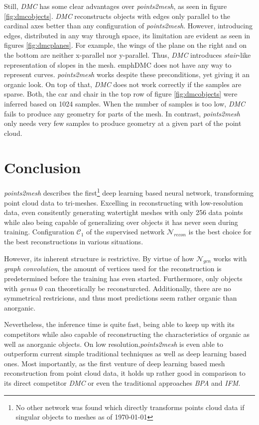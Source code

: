   Still, \emph{DMC} has some clear advantages over \emph{points2mesh}, as seen in figure \ref{fig:dmcobjects}. \emph{DMC} reconstructs objects with edges only 
  parallel to the cardinal axes better than any configuration of \emph{points2mesh}. However, introducing edges, distributed in any way through space,
  its limitation are evident as seen in figures \ref{fig:dmcplanes}. For example, the wings of the plane on the right and on the bottom are neither x-parallel nor y-parallel.
  Thus, \emph{DMC} introduces \emph{stair}-like representation of slopes in the mesh. emph{DMC} does not have any way to represent curves. \emph{points2mesh}
  works despite these preconditions, yet giving it an organic look.
  On top of that, \emph{DMC} does not work correctly if the samples are sparse. Both, the car and chair in the top row of figure \ref{fig:dmcobjects} were inferred based on 1024 samples.
  When the number of samples is too low, \emph{DMC} fails to produce any geometry for parts of the mesh.
  In contrast, \emph{points2mesh} only needs very few samples to produce geometry at a given part of the point cloud.

\section{Conclusion}
\label{conclusion}
  \emph{points2mesh} describes the first\footnote{No other network was found which directly transforms points cloud data if singular objects to meshes as of \today} deep
  learning based neural network, transforming point cloud data to tri-meshes. Excelling in reconstructing with low-resolution data,
  even consitently generating watertight meshes with only 256 data points while also being capable of generalizing over objects it has never seen 
  during training. Configuration $\mathcal{C}_1$ of the supervised network $\mathcal{N}_{recon}$ is the best choice for the best reconstructions
  in various situations.

  However, its inherent structure is restrictive. By virtue of how $\mathcal{N}_{gcn}$ works with \emph{graph convolution}, the amount
  of vertices used for the reconstruction is predetermined before the training has even started. Furthermore, only objects with \emph{genus} 0 
  can theoretically be reconsturcted. Additionally, there are no symmetrical restricions, and thus most predictions seem rather organic than anorganic.

  Nevertheless, the inference time is quite fast, being able to keep up with its competitors while also capable of reconstructing
  the characteristics of organic as well as anorganic objects. On low resolution,\emph{points2mesh} is even able to outperform current
  simple traditional techniques as well as deep learning based ones. Most importantly, as the first venture of deep learning based mesh reconstruction 
  from point cloud data, it holds up rather good in comparison to its direct competitor \emph{DMC} or even the traditional approaches \emph{BPA} and \emph{IFM}.



